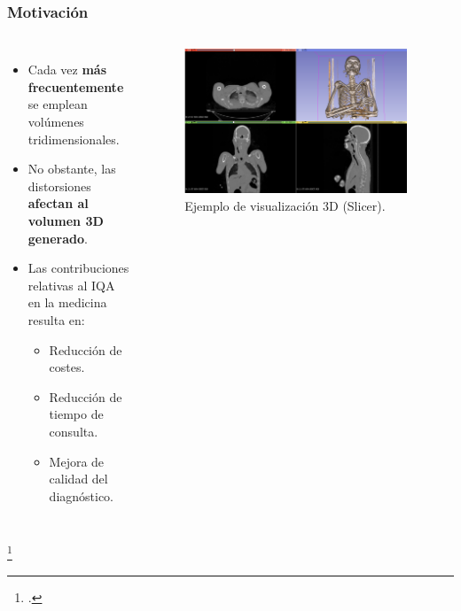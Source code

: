 \begin{frame}
  \frametitle{Motivación}
  \begin{columns}
    \begin{itemize}
    \item Cada vez \textbf{más frecuentemente} se emplean volúmenes tridimensionales.
    \item No obstante, las distorsiones \textbf{afectan al volumen 3D generado}. 
    \item Las contribuciones relativas al IQA en la medicina resulta en: 
      \begin{itemize}
        \item Reducción de costes. 
        \item Reducción de tiempo de consulta.
        \item Mejora de calidad del diagnóstico.
      \end{itemize}
    \end{itemize}
  \begin{figure}
    \begin{center}
      \includegraphics[width=0.95\textwidth]{imagenes/chapter1/SlicerVisualization}
    \end{center}
    \caption{Ejemplo de visualización 3D (Slicer\footnotemark).}
  \end{figure}
  \end{columns}
  \footcitetext{Slicer3D}
\end{frame}

